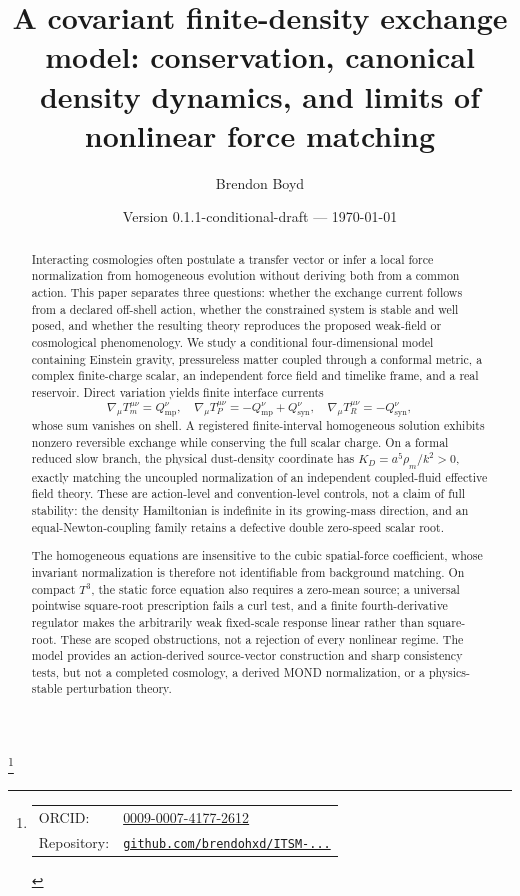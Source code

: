 \documentclass[aps,prd,reprint,superscriptaddress,nofootinbib,floatfix]{revtex4-2}
\newcommand{\Tthree}{T^{3}}
\newcommand{\Qmp}{Q_{\mathrm{mp}}}
\newcommand{\Qsyn}{Q_{\mathrm{syn}}}
\begin{document}
\title{A covariant finite-density exchange model: conservation, canonical
density dynamics, and limits of nonlinear force matching}

\author{Brendon Boyd}
\thanks{%
\begin{tabular}{@{}l@{\ }l@{}}
ORCID: & \href{https://orcid.org/0009-0007-4177-2612}{0009-0007-4177-2612} \\
Repository: & \href{https://github.com/brendohxd/ITSM-Integrated-Toroidal-Syntropic-Model}{\texttt{github.com/brendohxd/ITSM-...}} \\
\end{tabular}%
}

\date{Version 0.1.1-conditional-draft --- \today}

\begin{abstract}
Interacting cosmologies often postulate a transfer vector or infer a local
force normalization from homogeneous evolution without deriving both from a
common action.  This paper separates three questions: whether the exchange
current follows from a declared off-shell action, whether the constrained
system is stable and well posed, and whether the resulting theory reproduces
the proposed weak-field or cosmological phenomenology.  We study a conditional
four-dimensional model containing Einstein gravity, pressureless matter
coupled through a conformal metric, a complex finite-charge scalar, an
independent force field and timelike frame, and a real reservoir.  Direct
variation yields finite interface currents
\[
 \nabla_\mu T_m^{\mu\nu}=\Qmp^\nu,\quad
 \nabla_\mu T_P^{\mu\nu}=-\Qmp^\nu+\Qsyn^\nu,\quad
 \nabla_\mu T_R^{\mu\nu}=-\Qsyn^\nu,
\]
whose sum vanishes on shell.  A registered finite-interval homogeneous
solution exhibits nonzero reversible exchange while conserving the full scalar
charge.  On a formal reduced slow branch, the physical dust-density coordinate
has
\(K_D=a^5\rho_m/k^2>0\), exactly matching the uncoupled normalization of an
independent coupled-fluid effective field theory.  These are action-level and
convention-level controls, not a claim of full stability: the density
Hamiltonian is indefinite in its growing-mass direction, and an
equal-Newton-coupling family retains a defective double zero-speed scalar
root.

The homogeneous equations are insensitive to the cubic spatial-force
coefficient, whose invariant normalization is therefore not identifiable from
background matching.  On compact \(\Tthree\), the static force equation also
requires a zero-mean source; a universal pointwise square-root prescription
fails a curl test, and a finite fourth-derivative regulator makes the
arbitrarily weak fixed-scale response linear rather than square-root.  These
are scoped obstructions, not a rejection of every nonlinear regime.  The
model provides an action-derived source-vector construction and sharp
consistency tests, but not a completed cosmology, a derived MOND
normalization, or a physics-stable perturbation theory.
\end{abstract}
\end{document}
